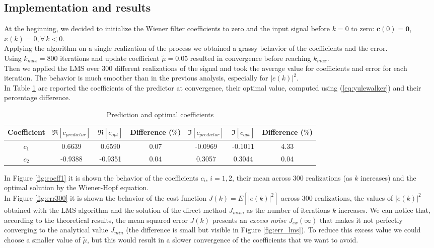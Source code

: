 \documentclass[a4paper, 12pt]{report}
\begin{document}
\subsection*{Implementation and results}
At the beginning, we decided to initialize the Wiener filter coefficients to zero and the input signal before $k=0$ to zero: $\mathbf{c}(0) = \mathbf{0}$, $x(k) = 0, \forall \, k<0$. \\
Applying the algorithm on a single realization of the process we obtained a grassy behavior of the coefficients and the error.\\
Using $k_{max} = 800$ iterations and update coefficient $\tilde{\mu} = 0.05$ resulted in convergence before reaching $k_{max}$.\\
Then we applied the LMS over 300 different realizations of the signal and took the average value for coefficients and error for each iteration. The behavior is much smoother than in the previous analysis, especially for $|e(k)|^2$.\\
In Table \ref{tab:predopt} are reported the coefficients of the predictor at convergence, their optimal value, computed using (\ref{eq:yulewalker}) and their percentage difference.

\begin{table}[H]
	\centering
	\begin{tabular}{c|cc|c|cc|c}
	\toprule
	Coefficient	& $\Re[c_{predictor}]$ 	& $\Re[c_{opt}]$	& Difference ($\%$)	& $\Im[c_{predictor}]$	& $\Im[c_{opt}]$ & Difference ($\%$) \\
	\midrule
	$c_1$ 	& 0.6639	& 0.6590		& 0.07 & -0.0969	& -0.1011	& 4.33 \\
	$c_2$	& -0.9388	& -0.9351		& 0.04 & 0.3057		& 0.3044 	& 0.04 \\
	\bottomrule
	\end{tabular}
	\caption{Prediction and optimal coefficients}
	\label{tab:predopt}
\end{table}

In Figure \ref{fig:coeff1} it is shown the behavior of the coefficients $c_i, \, i=1,2$,  their mean across 300 realizations (as $k$ increases) and the optimal solution by the Wiener-Hopf equation.\\
In Figure \ref{fig:err300} it is shown the behavior of the cost function $J(k) = E \left[ |e(k)|^2 \right]$  across 300 realizations, the values of $|e(k)|^2$ obtained with the LMS algorithm and the solution of the direct method $J_{min}$, as the number of iterations $k$ increases. We can notice that, according to the theoretical results, the mean squared error $J(k)$ presents an \emph{excess noise} $J_{ex}(\infty)$ that makes it not perfectly converging to the analytical value $J_{min}$ (the difference is small but visible in Figure \ref{fig:err_lms}). To reduce this excess value we could choose a smaller value of $\tilde{\mu}$, but this would result in a slower convergence of the coefficients that we want to avoid.
\end{document}
